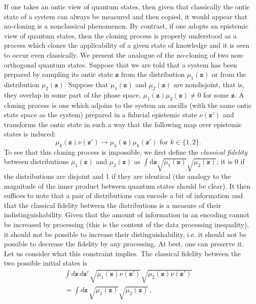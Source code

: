 \documentclass[pra,superscriptaddress,nofootinbib,12pt]{revtex4-2}
\def\be{\begin{equation}}
\def\ee{\end{equation}}
\begin{document}
If one takes an ontic view of quantum states, then given that classically the ontic state of a system can always be measured and then copied, it would appear that no-cloning is a nonclassical phenomenon. By contrast, if one adopts an epistemic view of quantum states, then the cloning process is properly understood as a process which clones the applicability of a given state of knowledge and it is seen to occur even classically.  We present the analogue of the no-cloning of two non-orthogonal quantum states.  Suppose that we are told that a system has been prepared by sampling its ontic state $\mathbf{z}$ from the distribution $\mu_1(\mathbf{z})$ or from the distribution $\mu_2(\mathbf{z})$.  Suppose that $\mu_1(\mathbf{z})$ and $\mu_2(\mathbf{z})$ are nondisjoint, that is, they overlap in some part of the phase space, $\mu_{1}(\mathbf{z})\mu_{2}(\mathbf{z}) \ne 0$ for some $\mathbf{z}$.  A cloning process is one which adjoins to the system an ancilla (with the same ontic state space as the system) prepared in a fiducial epistemic state $\nu(\mathbf{z}')$ and transforms the ontic state in such a way that the following map over epistemic states is induced:
\be
\mu_k(\mathbf{z})\nu(\mathbf{z}') \to \mu_k(\mathbf{z})\mu_k(\mathbf{z}') \textrm{ for } k\in\{1,2\}.
\ee
To see that this cloning process is impossible, we first define the \emph{classical fidelity} between distributions $\mu_1(\mathbf{z})$ and $\mu_2(\mathbf{z})$ as $\int \textrm{d}\mathbf{z} \sqrt{\mu_1(\mathbf{z})}\sqrt{\mu_2(\mathbf{z})}$; it is 0 if the distributions are disjoint and 1 if they are identical (the analogy to the magnitude of the inner product between quantum states should be clear).  It then suffices to note that a pair of distributions can encode a bit of information and that the classical fidelity between the distributions is a measure of their indistinguishability.  Given that the amount of information in an encoding cannot be increased by processing (this is the content of the data processing inequality), it should not be possible to increase their distinguishability, i.e. it should not be possible to decrease the fidelity by any processing.  At best, one can preserve it.  Let us consider what this constraint implies.
The classical fidelity between the two possible initial states is
\begin{multline}
  \int d\mathbf{z}\,d\mathbf{z}'\,\sqrt{\mu_{1}(\mathbf{z})\nu(\mathbf{z}')}
  \sqrt{\mu_{2}(\mathbf{z})\nu(\mathbf{z}')} \\
  =\int d\mathbf{z}\,\sqrt{\mu_{1}(\mathbf{z})}\sqrt{\mu_{2}(\mathbf{z})}\,,
\end{multline}
\end{document}
